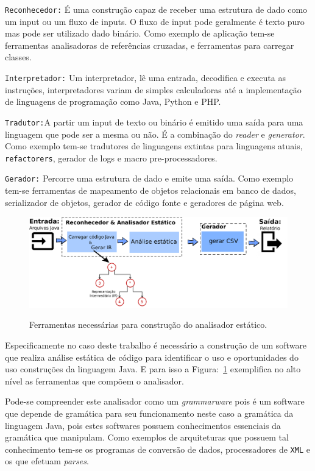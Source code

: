 \texttt{Reconhecedor:} É uma construç\~{a}o capaz de receber uma estrutura de dado como um input ou um fluxo de inputs. O fluxo de input pode geralmente \'{e} texto puro mas pode ser utilizado dado bin\'{a}rio. Como exemplo de aplicaç\~{a}o tem-se ferramentas analisadoras de referências cruzadas, e ferramentas para carregar classes.

\texttt{Interpretador:} Um interpretador, lê uma entrada, decodifica e executa as instruç\~{o}es, interpretadores variam de simples calculadoras at\'{e} a implementaç\~{a}o de linguagens de programaç\~{a}o como Java, Python e PHP.

\texttt{Tradutor:}A partir um input de texto ou bin\'{a}rio \'{e} emitido uma sa\'{i}da para uma linguagem que pode ser a mesma ou n\~{a}o. É a combinaç\~{a}o do \textit{reader} e \textit{generator}. Como exemplo tem-se tradutores de linguagens extintas para linguagens atuais, \texttt{refactorers},  gerador de logs e macro pre-processadores.
	
\texttt{Gerador:} Percorre uma estrutura de dado e emite uma sa\'{i}da. Como exemplo tem-se ferramentas de mapeamento de objetos relacionais em banco de dados, serializador de objetos, gerador de c\'{o}digo fonte e geradores de p\'{a}gina web.


\begin{figure}[h]
	\center
	\includegraphics[scale=0.9]{Imagens/stagesAnalizer}
	\label{fig:stagesAnalyzer}
	\caption{Ferramentas necess\'{a}rias para construç\~{a}o do analisador est\'{a}tico.}
\end{figure}

Especificamente no caso deste trabalho \'{e} necess\'{a}rio a construç\~{a}o de um software que realiza an\'{a}lise est\'{a}tica de c\'{o}digo para identificar o uso e oportunidades do uso construç\~{o}es da linguagem Java. E para isso a Figura:~\ref{fig:stagesAnalyzer} exemplifica no alto n\'{i}vel as ferramentas que comp\~{o}em o analisador.



Pode-se compreender este analisador como um {\it grammarware} pois \'{e} um software que depende de gram\'{a}tica para seu funcionamento neste caso a gram\'{a}tica da linguagem Java, pois estes softwares possuem conhecimentos essenciais da  gram\'{a}tica que manipulam. Como exemplos de arquiteturas que possuem tal conhecimento tem-se os programas de convers\~{a}o de dados, processadores de \texttt{XML} e os que efetuam \textit{parses}.

